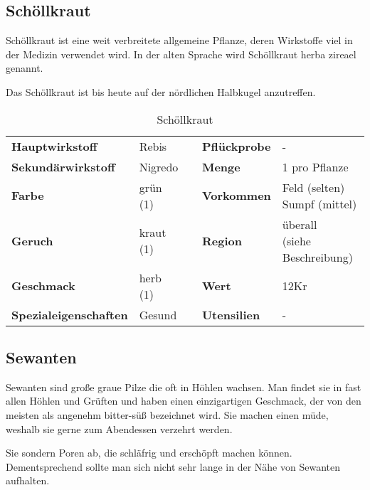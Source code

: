 \subsection{Schöllkraut}
Schöllkraut ist eine weit verbreitete allgemeine Pflanze, deren Wirkstoffe viel in der Medizin verwendet wird. In der alten Sprache wird Schöllkraut herba zireael genannt.

Das Schöllkraut ist bis heute auf der nördlichen Halbkugel anzutreffen. 

\begin{table}[H] 
\begin{center} 
\begin{tabular}{|l|l|p{1cm}|l|l|} 
  	\cline{1-2} \cline{4-5} 
  	\textbf{Hauptwirkstoff} & Rebis && \textbf{Pflückprobe} & - \\ \cline{1-2} \cline{4-5} 
  	\textbf{Sekundärwirkstoff} & Nigredo && \textbf{Menge} & 1 pro Pflanze \\ \cline{1-2} \cline{4-5} 
  	\textbf{Farbe} & grün (1) && \textbf{Vorkommen} & \brcell{Feld (selten) \\ Sumpf (mittel)} \\ \cline{1-2} \cline{4-5} 
  	\textbf{Geruch} & kraut (1) && \textbf{Region} & \brcell{überall \\ (siehe Beschreibung)} \\ \cline{1-2} \cline{4-5} 
  	\textbf{Geschmack} & herb (1) && \textbf{Wert} & 12Kr \\ \cline{1-2} \cline{4-5} 
  	\textbf{Spezialeigenschaften} & Gesund && \textbf{Utensilien} & - \\ \cline{1-2} \cline{4-5} 
\end{tabular} 
\end{center} 
\caption{Schöllkraut} 
\label{tab:schoellkraut} 
\end{table}

\subsection{Sewanten}
Sewanten sind große graue Pilze die oft in Höhlen wachsen. Man findet sie in fast allen Höhlen und Grüften und haben einen einzigartigen Geschmack, der von den meisten als angenehm bitter-süß bezeichnet wird. Sie machen einen müde, weshalb sie gerne zum Abendessen verzehrt werden.

Sie sondern Poren ab, die schläfrig und erschöpft machen können. Dementsprechend sollte man sich nicht sehr lange in der Nähe von Sewanten aufhalten.

